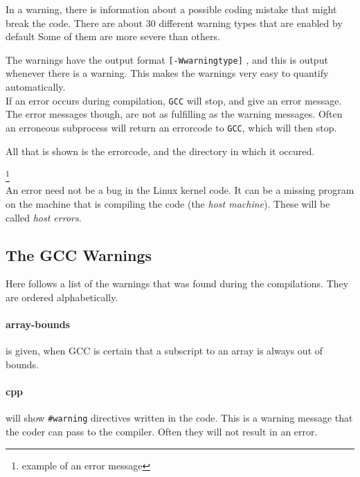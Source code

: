 \documentclass[a4paper,11pt]{report}
\newcommand{\textcode}[1]{
    \fboxsep=1pt
    \texttt{\colorbox{gray!20}{#1}}
}
\newcommand{\figa}{
    \begin{figure}[!htpb]
    \centering
}
\newcommand{\figb}[2]{
    \caption{#1}
    \label{#2}
    \end{figure}
}
\begin{document}
In a warning, there is information about a possible coding mistake that might 
break the code. There are about 30 different warning types that are enabled by 
default \cite{gccwarnings} Some of them are more severe than others.

The warnings have the output format \textcode{[-Wwarningtype]}, and this is 
output whenever there is a warning. This makes the warnings very easy to 
quantify automatically.
\\

If an error occurs during compilation, \texttt{GCC} will stop, and give an error
message. The error messages though, are not as fulfilling as the warning 
messages. Often an erroneous subprocess will return an errorcode to 
\texttt{GCC}, which will then stop. 

All that is shown is the errorcode, and the directory in which it occured.

    \footnote{example of an error message}
\\

An error need not be a bug in the Linux kernel code. It can be a missing program
on the machine that is compiling the code (the \emph{host machine}). These will
be called \emph{host errors}.
\\




        \subsection{The GCC Warnings}
Here follows a list of the warnings that was found during the compilations. 
They are ordered alphabetically.


            \paragraph{array-bounds}
is given, when GCC is certain that a subscript to an array is always out of 
bounds.




            \paragraph{cpp}
will show \textcode{\#warning} directives written in the code. This is a warning
message that the coder can pass to the compiler. Often they will not result in 
an error.
\end{document}
